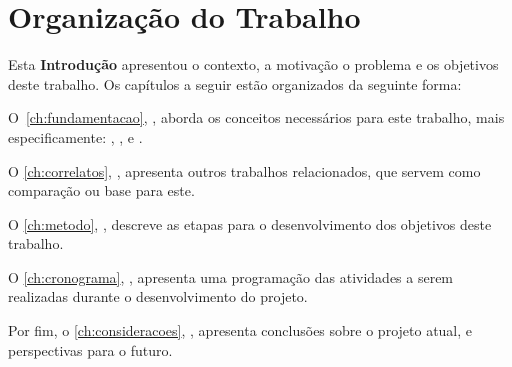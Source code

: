 

\section{Organização do Trabalho}\label{sec:organizacao}
Esta \textbf{Introdução} apresentou o contexto, a motivação o problema e os objetivos deste trabalho. Os capítulos a seguir estão organizados da seguinte forma:

O~\autoref{ch:fundamentacao}, \textbf{}, aborda os conceitos necessários para este trabalho, mais especificamente: , ,  e .

O \autoref{ch:correlatos}, \textbf{}, apresenta outros trabalhos relacionados, que servem como comparação ou base para este.

O \autoref{ch:metodo}, \textbf{}, descreve as etapas para o desenvolvimento dos objetivos deste trabalho.

O \autoref{ch:cronograma}, \textbf{}, apresenta uma programação das atividades a serem realizadas durante o desenvolvimento do projeto.

Por fim, o \autoref{ch:consideracoes}, \textbf{}, apresenta conclusões sobre o projeto atual, e perspectivas para o futuro.